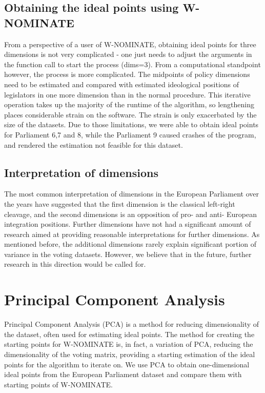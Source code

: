 \documentclass[a4paper,12pt]{report}
\begin{document}
    \subsection{Obtaining the ideal points using W-NOMINATE}\label{subsec:obtaining-the-ideal-points-using-w-nominate}
    From a perspective of a user of W-NOMINATE, obtaining ideal points for three dimensions is not very complicated
    - one just needs to adjust the arguments in the function call to start the process (dims=3).
    From a
    computational standpoint however, the process is more complicated.
    The midpoints of policy dimensions need to be estimated and compared with estimated ideological positions of
    legislators
    in one more dimension than in the normal procedure.
    This iterative operation takes up the majority of the runtime of the algorithm,
    so lengthening places considerable strain on the software.
    The strain is only exacerbated by the size of the datasets.
    Due to those limitations, we were able to obtain ideal points for Parliament
    6,7 and 8, while the Parliament 9 caused crashes of the program, and rendered the estimation not feasible for this
    dataset.

    \subsection{Interpretation of dimensions}\label{subsec:interpretation-of-dimensions}
    The most common interpretation of dimensions in the European Parliament over the years have suggested that the first
    dimension
    is the classical left-right cleavage, and the second dimensions is an opposition of pro- and anti- European
    integration positions.
    Further dimensions have not had a significant amount of research aimed at providing reasonable interpretations for
    further dimensions.
    As mentioned before, the additional dimensions rarely explain significant portion of variance in the voting
    datasets.
    However, we believe that in the future, further research in this direction would be called for.


    \section{Principal Component Analysis}\label{sec:principal-component-analysis}
    Principal Component Analysis (PCA) is a method for reducing dimensionality of the dataset, often used for
    estimating ideal points. The method for creating the starting points for W-NOMINATE is, in fact, a variation of
    PCA, reducing the dimensionality of the voting matrix, providing a starting estimation of the ideal points for
    the algorithm to iterate on. We use PCA to obtain one-dimensional ideal points from the European Parliament
    dataset and compare them with starting points of W-NOMINATE.
    \label{subsec:pca}
\end{document}
